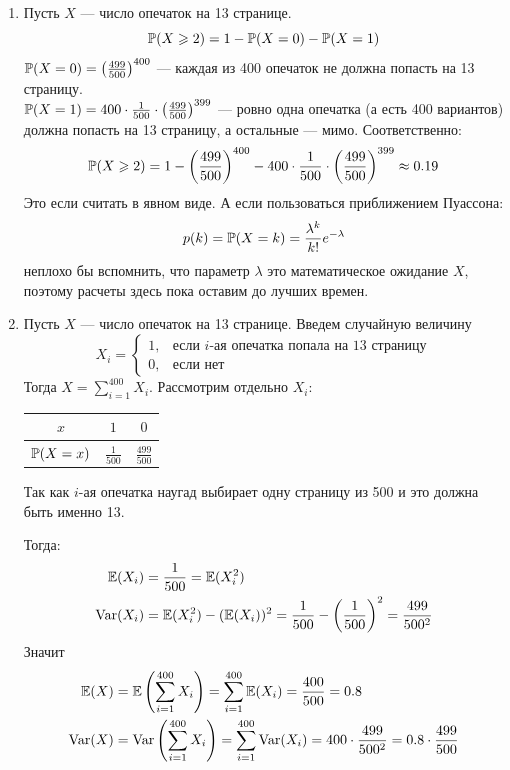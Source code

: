 \begin{enumerate}
\begin{enumerate}
\item Пусть $X$ — число опечаток на 13 странице. \[\P(X \geqslant 2) = 1 - \P(X=0) - \P(X=1) \]
$\P(X=0) = \left( \frac{499}{500} \right)^{400}$ — каждая из 400 опечаток не должна попасть на 13 страницу.\\
$\P(X=1) = 400\cdot\frac{1}{500}\cdot\left( \frac{499}{500} \right)^{399}$ — ровно одна опечатка (а есть 400 вариантов) должна попасть на 13 страницу, а остальные — мимо. Соответственно:
\[
\P(X \geqslant 2) = 1 - \left( \frac{499}{500} \right)^{400} - 400\cdot\frac{1}{500}\cdot\left( \frac{499}{500} \right)^{399} \approx 0.19
\]
Это если считать в явном виде. А если пользоваться приближением Пуассона:
\[
p(k) = \P(X = k) = \frac{\lambda^k}{k!}e^{-\lambda}
\]
неплохо бы вспомнить, что параметр $\lambda$ это математическое ожидание $X$, поэтому расчеты здесь пока оставим до лучших времен.

\item Пусть $X$ — число опечаток на 13 странице. Введем случайную величину
\[X_i =
\begin{cases}
1, & \text{если } i\text{-ая опечатка попала на 13 страницу}\\
0, & \text{если нет}
\end{cases}
\]
Тогда $X = \sum\limits_{i=1}^{400}X_i$. Рассмотрим отдельно $X_i$:

\begin{center}
\begin{tabular}{@{}ccc@{}}
\toprule
$x$         & $1$             & $0$               \\ \midrule
$\P(X=x)$ & $\frac{1}{500}$ & $\frac{499}{500}$ \\ \bottomrule
\end{tabular}
\end{center}

Так как $i$-ая опечатка наугад выбирает одну страницу из 500 и это должна быть именно 13.

Тогда:
\begin{align*}
\E(X_i) &= \frac{1}{500} = \E(X^2_i)  \\
\Var(X_i) &= \E(X^2_i) - (\E(X_i))^2 = \frac{1}{500} - \left(\frac{1}{500}\right)^2 = \frac{499}{500^2}
\end{align*}
Значит
\begin{align*}
\E(X) &= \E\left(\sum\limits_{i=1}^{400}X_i\right) = \sum\limits_{i=1}^{400}\E(X_i)  = \frac{400}{500} = 0.8 \\
\Var(X) &= \Var\left(\sum\limits_{i=1}^{400}X_i\right) = \sum\limits_{i=1}^{400}\Var(X_i) = 400\cdot\frac{499}{500^2} = 0.8\cdot\frac{499}{500}
\end{align*}


\end{enumerate}
\end{enumerate}
